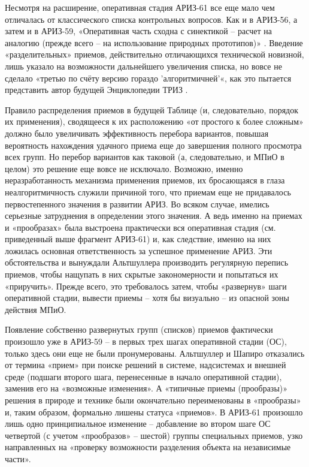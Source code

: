 \documentclass[11pt,a4paper]{article}
\begin{document}
Несмотря на расширение, оперативная стадия АРИЗ-61 все еще мало чем отличалась
от классического списка контрольных вопросов. Как и в АРИЗ-56, а затем и в
АРИЗ-59, «Оперативная часть сходна с синектикой -- расчет на аналогию (прежде
всего -- на использование природных прототипов)» \cite{Altshuller1986a}.
Введение «разделительных» приемов, действительно отличающихся технической
новизной, лишь указало на возможности дальнейшего увеличения списка, но вовсе
не сделало «третью по счёту версию гораздо 'алгоритмичней'«, как это пытается
представить автор будущей Энциклопедии ТРИЗ \cite{Korolyev1998}.

Правило распределения приемов в будущей Таблице (и, следовательно, порядок их
применения), сводящееся к их расположению «от простого к более сложным» должно
было увеличивать эффективность перебора вариантов, повышая вероятность
нахождения удачного приема еще до завершения полного просмотра всех групп. Но
перебор вариантов как таковой (а, следовательно, и МПиО в целом) это решение
еще вовсе не исключало. Возможно, именно неразработанность механизма
применения приемов, их бросающаяся в глаза неалгоритмичность служили причиной
того, что приемам еще не придавалось первостепенного значения в развитии АРИЗ.
Во всяком случае, имелись серьезные затруднения в определении этого значения.
А ведь именно на приемах и «прообразах» была выстроена практически вся
оперативная стадия (см. приведенный выше фрагмент АРИЗ-61) и, как следствие,
именно на них ложилась основная ответственность за успешное применение АРИЗ.
Эти обстоятельства и вынуждали Альтшуллера производить регулярную перепись
приемов, чтобы нащупать в них скрытые закономерности и попытаться их
«приручить». Прежде всего, это требовалось затем, чтобы «развернув» шаги
оперативной стадии, вывести приемы -- хотя бы визуально -- из опасной зоны
действия МПиО.

Появление собственно развернутых групп (списков) приемов фактически произошло
уже в АРИЗ-59 -- в первых трех шагах оперативной стадии (ОС), только здесь они
еще не были пронумерованы. Альтшуллер и Шапиро отказались от термина «прием»
при поиске решений в системе, надсистемах и внешней среде (подшаги второго
шага, перенесенные в начало оперативной стадии), заменив его на «возможные
изменения». А «типичные приемы (прообразы)» решения в природе и технике были
окончательно переименованы в «прообразы» и, таким образом, формально лишены
статуса «приемов». В АРИЗ-61 произошло лишь одно принципиальное изменение --
добавление во втором шаге ОС четвертой (с учетом «прообразов» -- шестой)
группы специальных приемов, узко направленных на «проверку возможности
разделения объекта на независимые части».
\end{document}

